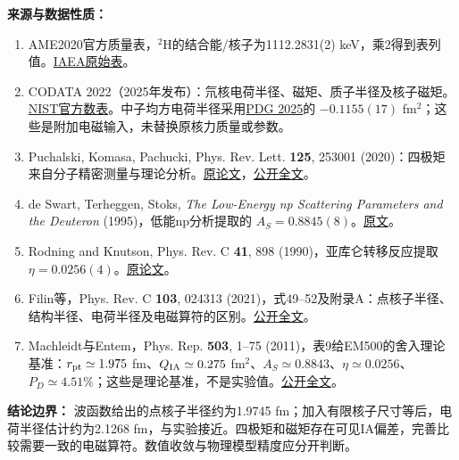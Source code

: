 \documentclass[UTF8,a4paper,landscape,10pt,fontset=fandol]{ctexart}
\begin{document}
\textbf{来源与数据性质：}
\begin{enumerate}
\item AME2020官方质量表，$^2$H的结合能/核子为1112.2831(2) keV，乘2得到表列值。\href{https://www-nds.iaea.org/amdc/ame2020/mass_1.mas20.txt}{IAEA原始表}。
\item CODATA 2022（2025年发布）：氘核电荷半径、磁矩、质子半径及核子磁矩。\href{https://physics.nist.gov/cuu/Constants/Table/allascii.txt}{NIST官方数表}。中子均方电荷半径采用\href{https://pdg.lbl.gov/2025/listings/rpp2025-list-n.pdf}{PDG 2025}的 $-0.1155(17)$ fm$^2$；这些是附加电磁输入，未替换原核力质量或参数。
\item Puchalski, Komasa, Pachucki, Phys. Rev. Lett. \textbf{125}, 253001 (2020)：四极矩来自分子精密测量与理论分析。\href{https://doi.org/10.1103/PhysRevLett.125.253001}{原论文}，\href{https://arxiv.org/pdf/2010.06888}{公开全文}。
\item de Swart, Terheggen, Stoks, \emph{The Low-Energy np Scattering Parameters and the Deuteron} (1995)，低能np分析提取的 $A_S=0.8845(8)$。\href{https://arxiv.org/pdf/nucl-th/9509032}{原文}。
\item Rodning and Knutson, Phys. Rev. C \textbf{41}, 898 (1990)，亚库仑转移反应提取 $\eta=0.0256(4)$。\href{https://doi.org/10.1103/PhysRevC.41.898}{原论文}。
\item Filin等，Phys. Rev. C \textbf{103}, 024313 (2021)，式49--52及附录A：点核子半径、结构半径、电荷半径及电磁算符的区别。\href{https://arxiv.org/pdf/2009.08911}{公开全文}。
\item Machleidt与Entem，Phys. Rep. \textbf{503}, 1--75 (2011)，表9给EM500的舍入理论基准：$r_{\rm pt}\simeq1.975$ fm、$Q_{\rm IA}\simeq0.275$ fm$^2$、$A_S\simeq0.8843$、$\eta\simeq0.0256$、$P_D\simeq4.51\%$；这些是理论基准，不是实验值。\href{https://arxiv.org/pdf/1105.2919}{公开全文}。
\end{enumerate}
\textbf{结论边界：} 波函数给出的点核子半径约为1.9745 fm；加入有限核子尺寸等后，电荷半径估计约为2.1268 fm，与实验接近。四极矩和磁矩存在可见IA偏差，完善比较需要一致的电磁算符。数值收敛与物理模型精度应分开判断。
\end{document}

